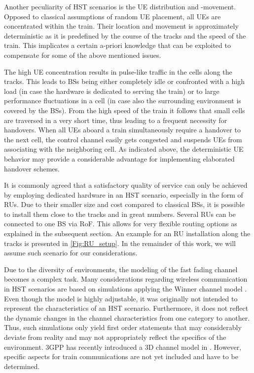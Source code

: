 \documentclass[a4paper,conference,twocolumn,10pt]{IEEEtran}
\begin{document}
Another peculiarity of \ac{HST} scenarios is the \ac{UE} distribution and -movement. Opposed to classical assumptions of random \ac{UE} placement, all \acp{UE} are concentrated within the train. Their location and movement is approximately deterministic as it is predefined by the course of the tracks and the speed of the train. This implicates a certain a-priori knowledge that can be exploited to compensate for some of the above mentioned issues.

The high \ac{UE} concentration results in pulse-like traffic in the cells along the tracks. This leads to \acp{BS} being either completely idle or confronted with a high load (in case the hardware is dedicated to serving the train) or to large performance fluctuations in a cell (in case also the surrounding environment is covered by the \acp{BS}). From the high speed of the train it follows that small cells are traversed in a very short time, thus leading to a frequent necessity for handovers. When all \acp{UE} aboard a train simultaneously require a handover to the next cell, the control channel easily gets congested and suspends \acp{UE} from associating with the neighboring cell. As indicated above, the deterministic \ac{UE} behavior may provide a considerable advantage for implementing elaborated handover schemes.

It is commonly agreed that a satisfactory quality of service can only be achieved by employing dedicated hardware in an \ac{HST} scenario, especially in the form of \acp{RU}. Due to their smaller size and cost compared to classical \acp{BS}, it is possible to install them close to the tracks and in great numbers. Several \acp{RU} can be connected to one \ac{BS} via \ac{RoF}. This allows for very flexible routing options as explained in the subsequent section. An example for an \ac{RU} installation along the tracks is presented in \cref{Fig:RU_setup}. In the remainder of this work, we will assume such scenario for our considerations.

Due to the diversity of environments, the modeling of the fast fading channel becomes a complex task. Many considerations regarding wireless communication in \ac{HST} scenarios are based on simulations applying the Winner channel model \cite{winner2model}. Even though the model is highly adjustable, it was originally not intended to represent the characteristics of an \ac{HST} scenario. Furthermore, it does not reflect the dynamic changes in the channel characteristics from one category to another. Thus, such simulations only yield first order statements that may considerably deviate from reality and may not appropriately reflect the specifics of the environment. 3GPP has recently introduced a 3D channel model in \cite{3gpp36873}. However, specific aspects for train communications are not yet included and have to be determined.
\end{document}
